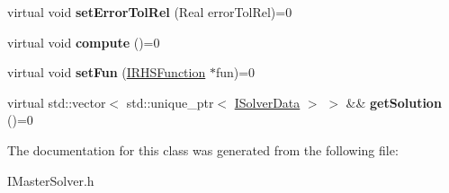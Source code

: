 \begin{DoxyCompactItemize}
\item 
\hypertarget{classIMasterSolver_ace3b6564185972f0f1f22471c8be2faa}{
virtual void {\bfseries setErrorTolRel} (Real errorTolRel)=0}
\label{classIMasterSolver_ace3b6564185972f0f1f22471c8be2faa}

\item 
\hypertarget{classIMasterSolver_a69c6587bf3ec8d1c58a597f6138b7565}{
virtual void {\bfseries compute} ()=0}
\label{classIMasterSolver_a69c6587bf3ec8d1c58a597f6138b7565}

\item 
\hypertarget{classIMasterSolver_a23c8ea4a7018bd4daea1e911fa851715}{
virtual void {\bfseries setFun} (\hyperlink{classIRHSFunction}{IRHSFunction} $\ast$fun)=0}
\label{classIMasterSolver_a23c8ea4a7018bd4daea1e911fa851715}

\item 
\hypertarget{classIMasterSolver_a19e1fb93fa07956cbe21ef24aeb23f0b}{
virtual std::vector$<$ std::unique\_\-ptr$<$ \hyperlink{classISolverData}{ISolverData} $>$ $>$ \&\& {\bfseries getSolution} ()=0}
\label{classIMasterSolver_a19e1fb93fa07956cbe21ef24aeb23f0b}

\end{DoxyCompactItemize}


The documentation for this class was generated from the following file:\begin{DoxyCompactItemize}
\item 
IMasterSolver.h\end{DoxyCompactItemize}
